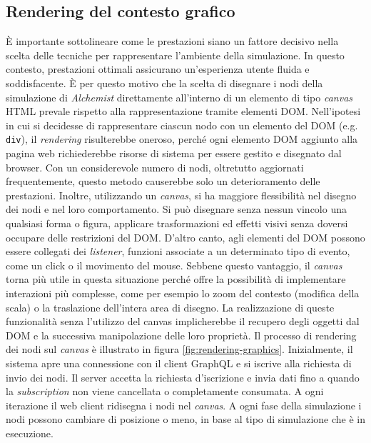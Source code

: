 \subsection{Rendering del contesto grafico}
È importante sottolineare come le prestazioni siano un fattore decisivo nella scelta delle tecniche per rappresentare l'ambiente della simulazione.
In questo contesto, prestazioni ottimali assicurano un'esperienza utente fluida e soddisfacente. È per questo motivo che la scelta di disegnare i nodi della simulazione di \textit{Alchemist} direttamente all'interno di un elemento di tipo \textit{canvas } HTML prevale rispetto alla rappresentazione tramite elementi \ac{DOM}. Nell'ipotesi in cui si decidesse di rappresentare ciascun nodo con un elemento del DOM (e.g. \texttt{div}), il \textit{rendering} risulterebbe oneroso, perché ogni elemento \ac{DOM} aggiunto alla pagina web richiederebbe risorse di sistema per essere gestito e disegnato dal browser. Con un considerevole numero di nodi, oltretutto aggiornati frequentemente, questo metodo causerebbe solo un deterioramento delle prestazioni. Inoltre, utilizzando un \textit{canvas}, si ha maggiore flessibilità nel disegno dei nodi e nel loro comportamento. Si può disegnare senza nessun vincolo una qualsiasi forma o figura, applicare trasformazioni ed effetti visivi senza doversi occupare delle restrizioni del \ac{DOM}. D'altro canto, agli elementi del \ac{DOM} possono essere collegati dei \textit{listener}, funzioni associate a un determinato tipo di evento, come un click o il movimento del mouse. Sebbene questo vantaggio, il \textit{canvas} torna più utile in questa situazione perché offre la possibilità di implementare interazioni più complesse, come per esempio lo zoom del contesto (modifica della scala) o la traslazione dell'intera area di disegno. La realizzazione di queste funzionalità senza l'utilizzo del canvas implicherebbe il recupero degli oggetti dal \ac{DOM} e la successiva manipolazione delle loro proprietà.
Il processo di rendering dei nodi sul \textit{canvas} è illustrato in figura \cref{fig:rendering-graphics}. Inizialmente, il sistema apre una connessione con il client GraphQL e si iscrive alla richiesta di invio dei nodi. Il server accetta la richiesta d'iscrizione e invia dati fino a quando la \textit{subscription} non viene cancellata o completamente consumata. A ogni iterazione il web client ridisegna i nodi nel \textit{canvas}.
A ogni fase della simulazione i nodi possono cambiare di posizione o meno, in base al tipo di simulazione che è in esecuzione. 
